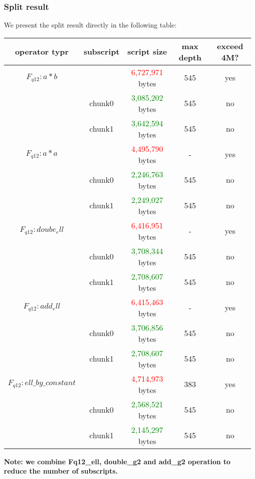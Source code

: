 \subsubsection{Split result}

We present the split result directly in the following table:

\begin{center}
\begin{tabular}{|c|c|c|c|c|} \hline
    operator typr & subscript & script size & max depth & exceed 4M? \\ \hline
    $F_{q12}: a * b$ & & \textcolor{red}{6,727,971} bytes & 545 & yes \\ \hline
     & chunk0 & \textcolor{green}{ 3,085,202 } bytes & 545 & no \\ \hline
     & chunk1 & \textcolor{green}{ 3,642,594} bytes & 545 & no \\ \hline
    $F_{q12}: a * a$ & & \textcolor{red}{4,495,790} bytes & - & yes \\ \hline
    & chunk0 & \textcolor{green}{2,246,763} bytes & 545 & no \\ \hline
    & chunk1 & \textcolor{green}{2,249,027} bytes & 545 & no \\ \hline
    $F_{q12}: doube_ell $ & & \textcolor{red}{6,416,951} bytes & - & yes \\ \hline
    & chunk0 & \textcolor{green}{3,708,344} bytes & 545 & no \\ \hline
    & chunk1 & \textcolor{green}{2,708,607} bytes & 545 & no \\ \hline
    $F_{q12}: add_ell $ & & \textcolor{red}{6,415,463} bytes & - & yes \\ \hline
    & chunk0 & \textcolor{green}{3,706,856} bytes & 545 & no \\ \hline
    & chunk1 & \textcolor{green}{2,708,607} bytes & 545 & no \\ \hline
    $F_{q12}: ell\_by\_constant$ & & \textcolor{red}{4,714,973} bytes & 383 & yes \\ \hline
    & chunk0 & \textcolor{green}{2,568,521} bytes & 545 & no \\ \hline
    & chunk1 & \textcolor{green}{2,145,297} bytes & 545 & no \\ \hline
\end{tabular}
\end{center}

\textbf{Note: we combine Fq12\_ell, double\_g2 and add\_g2 operation to reduce the number of subscripts.}
